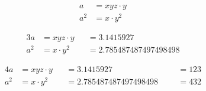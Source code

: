 \documentclass[12pt,ngerman,parskip=full]{scrbook}
\begin{document}
\begin{align*} %
	a &= xyz \cdot y \\
	a^2 &= x \cdot y^2 
\end{align*}


\begin{alignat}{3}
	a       &= xyz \cdot y &&= 3.1415927 \\
	a^2 &= x \cdot y^2 &&= 2.785487487497498498 
\end{alignat}

\begin{alignat}{4}
	a       &= xyz \cdot y &&= 3.1415927 &&&= 123 \\
	a^2 &= x \cdot y^2 &&= 2.785487487497498498 &&&= 432 
\end{alignat}
\end{document}
